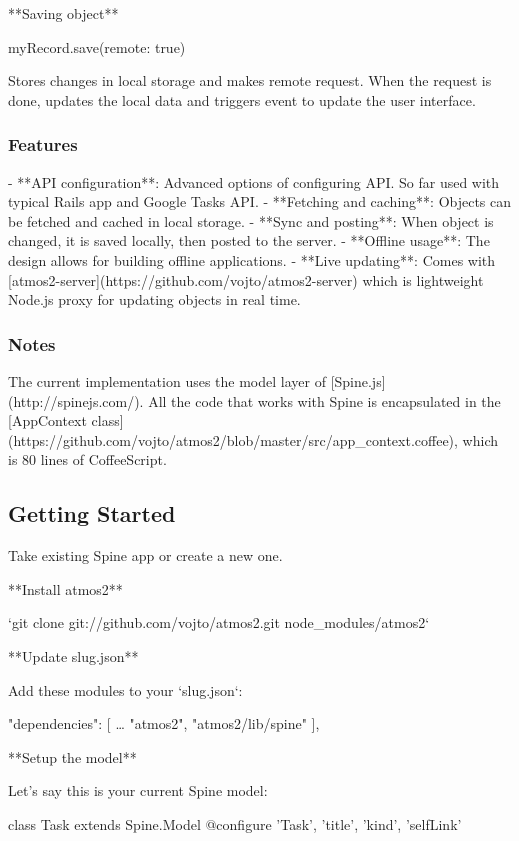 **Saving object**

    myRecord.save(remote: true)
    
Stores changes in local storage and makes remote request. When the request is done, updates the local data and triggers event to update the user interface.

\subsubsection{Features}

- **API configuration**: Advanced options of configuring API. So far used with typical Rails app and Google Tasks API.
- **Fetching and caching**: Objects can be fetched and cached in local storage.
- **Sync and posting**: When object is changed, it is saved locally, then posted to the server.
- **Offline usage**: The design allows for building offline applications.
- **Live updating**: Comes with [atmos2-server](https://github.com/vojto/atmos2-server) which is lightweight Node.js proxy for updating objects in real time. 

\subsubsection{Notes}

The current implementation uses the model layer of [Spine.js](http://spinejs.com/). All the code that works with Spine is encapsulated in the [AppContext class](https://github.com/vojto/atmos2/blob/master/src/app_context.coffee), which is 80 lines of CoffeeScript.

\subsection{Getting Started}

Take existing Spine app or create a new one.

**Install atmos2**

`git clone git://github.com/vojto/atmos2.git node_modules/atmos2`

**Update slug.json**

Add these modules to your `slug.json`:

    "dependencies": [
		…
    	"atmos2",
    	"atmos2/lib/spine"
  	],

**Setup the model**

Let's say this is your current Spine model:

    class Task extends Spine.Model
      @configure 'Task', 'title', 'kind', 'selfLink'

